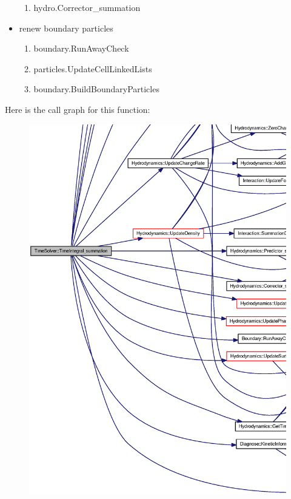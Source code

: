 \begin{itemize}
\begin{enumerate}
\item hydro.Corrector\_\-summation\end{enumerate}


\item renew boundary particles

\begin{enumerate}
\item boundary.RunAwayCheck

\item particles.UpdateCellLinkedLists

\item boundary.BuildBoundaryParticles\end{enumerate}
\end{itemize}


Here is the call graph for this function:\nopagebreak
\begin{figure}[H]
\begin{center}
\leavevmode
\includegraphics[width=409pt]{classTimeSolver_2cbbdd8eecbd3aae12c153f8b9da1402_cgraph}
\end{center}
\end{figure}


